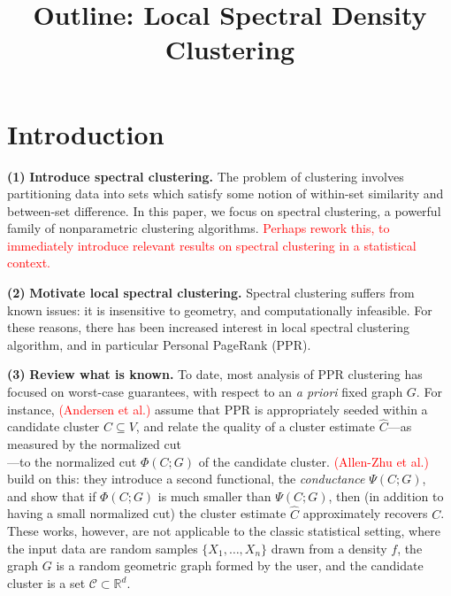 \documentclass{article}
\newcommand{\Reals}{\mathbb{R}}
\newcommand{\1}{\mathbf{1}}
\newcommand{\Rd}{\Reals^d}
\newcommand{\mc}[1]{\mathcal{#1}}
\newcommand{\wh}[1]{\widehat{#1}}
\theoremstyle{alden}
\theoremstyle{aldenthm}
\theoremstyle{definition}
\theoremstyle{remark}
\begin{document}
	
\title{Outline: Local Spectral Density Clustering}
\date{}
\maketitle

\section{Introduction}

\textbf{(1)} \textbf{Introduce spectral clustering.} The problem of clustering involves partitioning data into sets which satisfy some notion of within-set similarity and between-set difference. In this paper, we focus on spectral clustering, a powerful family of nonparametric clustering algorithms. \textcolor{red}{Perhaps rework this, to immediately introduce relevant results on spectral clustering in a statistical context.}

\textbf{(2)} \textbf{Motivate local spectral clustering.} Spectral clustering suffers from known issues: it is insensitive to geometry, and computationally infeasible. For these reasons, there has been increased interest in local spectral clustering algorithm, and in particular Personal PageRank (PPR).

\textbf{(3)} \textbf{Review what is known.} To date, most analysis of PPR clustering has focused on worst-case guarantees, with respect to an \textit{a priori} fixed graph $G$. For instance, \textcolor{red}{(Andersen et al.)} assume that PPR is appropriately seeded within a candidate cluster $C \subseteq V$, and relate the quality of a cluster estimate $\wh{C}$---as measured by the normalized cut
\begin{equation}
\label{eqn:normalized_cut}
\end{equation}
---to the normalized cut $\Phi(C;G)$ of the candidate cluster.
\textcolor{red}{(Allen-Zhu et al.)} build on this: they introduce a second functional, the \emph{conductance} $\Psi(C;G)$,
\begin{equation}
\label{eqn:conductance}
\end{equation}
and show that if $\Phi(C;G)$ is much smaller than $\Psi(C;G)$, then (in addition to having a small normalized cut) the cluster estimate $\wh{C}$ approximately recovers $C$. 
These works, however, are not applicable to the classic statistical setting, where the input data are random samples $\{X_1,\ldots,X_n\}$ drawn from a density $f$, the graph $G$ is a random geometric graph formed by the user, and the candidate cluster is a set $\mc{C} \subset \Rd$. 
\end{document}
